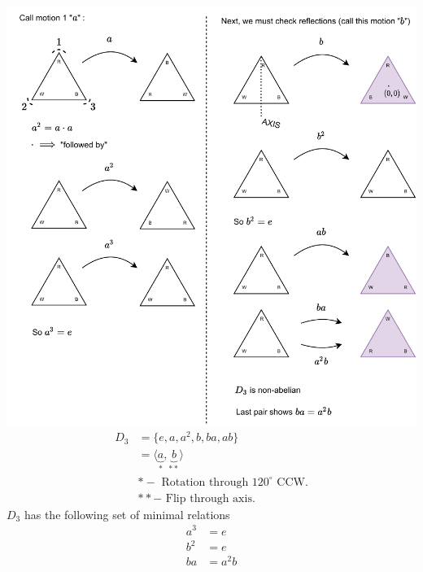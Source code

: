 \begin{example}
\hspace{-0.5in}\includegraphics[width=1.1\textwidth]{Figures/Dihedral Group Example_2.pdf}\\
\begin{align}
    D_3&= \{e,a,a^2,b,ba,ab\} \nonumber \\
    &= \langle \underbrace{a}_{*},\underbrace{b}_{**} \rangle \nonumber \\
    &* - \text{ Rotation through }120^\circ \text{ CCW.} \nonumber \\
    &** - \text{ Flip through axis.} \nonumber
\end{align}
$D_3$ has the following set of minimal relations
\begin{align}
    a^3&=e \nonumber \\
    b^2&=e \nonumber \\
    ba&=a^2b \nonumber 
\end{align}
\end{example}

